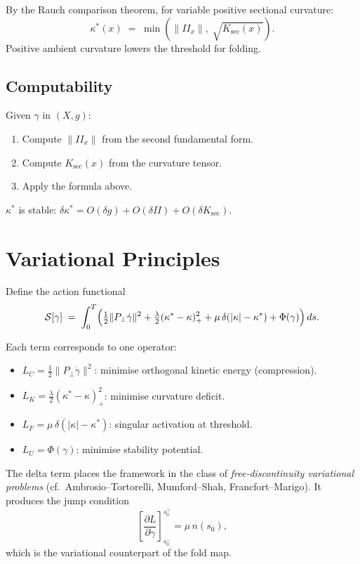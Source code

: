 \documentclass[12pt, oneside]{book}
\theoremstyle{plain}
\theoremstyle{definition}
\theoremstyle{remark}
\begin{document}
By the Rauch comparison theorem, for variable positive sectional
curvature:
\[
\kappa^*(x) \;=\; \min\!\left(\|II_x\|,\;
  \sqrt{K_{\mathrm{sec}}(x)}\right).
\]
Positive ambient curvature lowers the threshold for folding.

\subsection{Computability}

Given $\gamma$ in $(X,g)$:
\begin{enumerate}
\item Compute $\|II_x\|$ from the second fundamental form.
\item Compute $K_{\mathrm{sec}}(x)$ from the curvature tensor.
\item Apply the formula above.
\end{enumerate}

$\kappa^*$ is stable:
$\delta\kappa^* = O(\delta g) + O(\delta II)
  + O(\delta K_{\mathrm{sec}})$.

\section{Variational Principles}

Define the action functional
\[
\mathcal{S}[\gamma] \;=\; \int_0^T
\Bigl(
\tfrac{1}{2}\|P_\perp \dot\gamma\|^2
+ \tfrac{\lambda}{2}(\kappa^* - \kappa)_+^2
+ \mu\,\delta(|\kappa| - \kappa^*)
+ \Phi(\gamma)
\Bigr)\,ds.
\]

Each term corresponds to one operator:
\begin{itemize}
\item $L_C = \tfrac{1}{2}\|P_\perp\dot\gamma\|^2$: minimise
  orthogonal kinetic energy (compression).
\item $L_K = \tfrac{\lambda}{2}(\kappa^*-\kappa)_+^2$: minimise
  curvature deficit.
\item $L_F = \mu\,\delta(|\kappa|-\kappa^*)$: singular activation
  at threshold.
\item $L_U = \Phi(\gamma)$: minimise stability potential.
\end{itemize}

The delta term places the framework in the class of
\emph{free-discontinuity variational problems}
(cf.\ Ambrosio--Tortorelli, Mumford--Shah, Francfort--Marigo).
It produces the jump condition
\[
\left[\frac{\partial L}{\partial \dot\gamma}\right]_{s_0^-}^{s_0^+}
= \mu\,n(s_0),
\]
which is the variational counterpart of the fold map.
\end{document}
